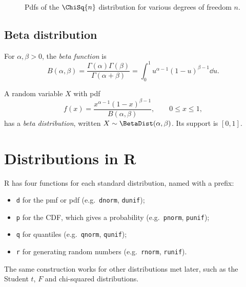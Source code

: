 \begin{figure}[ht]
\centering
{}
\caption{Pdfs of the $\ChiSq{n}$ distribution for various degrees of freedom $n$.}
\label{fig:chi-squared-pdfs}
\end{figure}


\subsection{Beta distribution}\label{sec:beta}

\begin{definition}\label{def:beta-function}
For $\alpha, \beta > 0$, the \emph{beta function} is
\[
  B(\alpha, \beta) = \frac{\Gamma(\alpha)\Gamma(\beta)}{\Gamma(\alpha + \beta)} = \int_0^1 u^{\alpha - 1} (1 - u)^{\beta - 1} \dd u.
\]
\end{definition}

\begin{definition}\label{def:beta-distribution}
A random variable $X$ with pdf
\[
  f(x) = \frac{x^{\alpha - 1} (1 - x)^{\beta - 1}}{B(\alpha, \beta)}, \qquad 0 \le x \le 1,
\]
has a \emph{beta distribution}, written $X \sim \BetaDist(\alpha, \beta)$. Its support is $[0, 1]$.
\end{definition}

\section{Distributions in R}\label{sec:distributions-in-r}

R has four functions for each standard distribution, named with a prefix:
\begin{itemize}
  \item \texttt{d} for the pmf or pdf (e.g.\ \texttt{dnorm}, \texttt{dunif});
  \item \texttt{p} for the CDF, which gives a probability (e.g.\ \texttt{pnorm}, \texttt{punif});
  \item \texttt{q} for quantiles (e.g.\ \texttt{qnorm}, \texttt{qunif});
  \item \texttt{r} for generating random numbers (e.g.\ \texttt{rnorm}, \texttt{runif}).
\end{itemize}
The same construction works for other distributions met later, such as the Student $t$, $F$ and chi-squared distributions.

